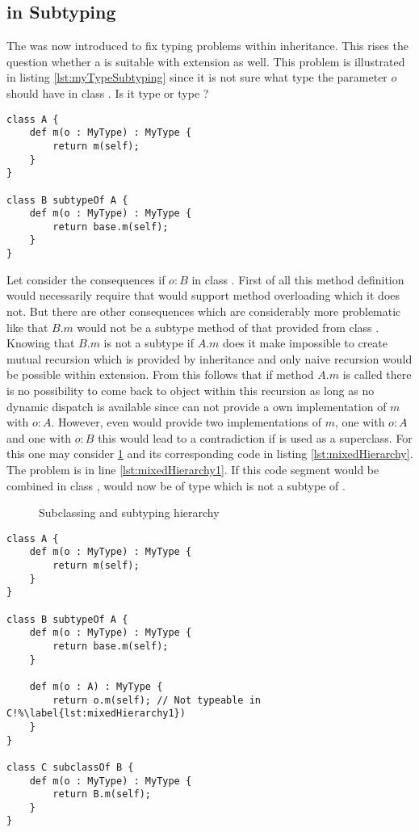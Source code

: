 \subsection{\mytype in Subtyping}
\label{ssec:mytypeInSubtype}
The \mytype was now introduced to fix typing problems within
inheritance. This rises the question whether a \mytype is suitable
with extension as well. This problem is illustrated in listing
\ref{lst:myTypeSubtyping} since it is not sure what type the parameter
$o$ should have in class \B. Is it type \B or type \A? 

\begin{lstlisting}[float,language=ooplss,caption=\mytype within subtyping contexts,label=lst:myTypeSubtyping]
class A {
	def m(o : MyType) : MyType {
		return m(self);
	}
}

class B subtypeOf A {
	def m(o : MyType) : MyType {
		return base.m(self);
	}
}
\end{lstlisting}

Let consider the consequences if $o : B$ in class \B. First of all this
method definition would necessarily require that \ooplss would support
method overloading which it does not. But there are other consequences which
are considerably more problematic like that $B.m$ would not be a subtype method of that
provided from class \A. Knowing that $B.m$ is not a subtype if $A.m$ does
it make impossible to create mutual recursion which is provided by inheritance
and only naive recursion would be possible within extension. From this follows
that if method $A.m$ is called there is no possibility to come back to object \B 
within this recursion as long as no dynamic dispatch is available since \B can 
not provide a own implementation of $m$ with $o : A$. However, even \B would
provide two implementations of $m$, one with $o : A$ and one with $o : B$ this
would lead to a contradiction if \B is used as a superclass. For this one may
consider \cref{fig:hierarchy} and its corresponding code in listing
\ref{lst:mixedHierarchy}. The problem is in line \ref{lst:mixedHierarchy1}. 
If this code segment would be combined in class \C, \self would now be of type
\C which is not a subtype of \A.

\begin{figure}[ht]
	\centering
	\caption{Subclassing and subtyping hierarchy}
	\label{fig:hierarchy}
\end{figure}

\begin{lstlisting}[float,language=ooplss,caption=Mixed extension and inheritance hierarchy,label=lst:mixedHierarchy]
class A {
	def m(o : MyType) : MyType {
		return m(self);
	}
}

class B subtypeOf A {
	def m(o : MyType) : MyType {
		return base.m(self);
	}

	def m(o : A) : MyType { 
		return o.m(self); // Not typeable in C!%\label{lst:mixedHierarchy1})
	}
}

class C subclassOf B {
	def m(o : MyType) : MyType {
		return B.m(self);
	}
}
\end{lstlisting}

